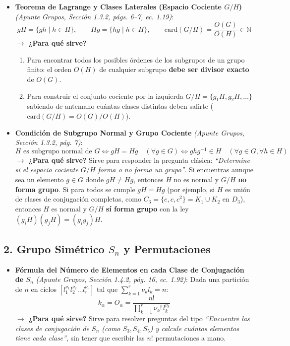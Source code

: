 \documentclass[11pt, a4paper]{article}
\begin{document}
\begin{itemize}
    \item \textbf{Teorema de Lagrange y Clases Laterales (Espacio Cociente $G/H$)} \textit{(Apunte Grupos, Sección 1.3.2, págs. 6--7, ec. 1.19)}:
    \[
    gH = \{gh \mid h \in H\}, \qquad Hg = \{hg \mid h \in H\}, \qquad \text{card}(G/H) = \frac{O(G)}{O(H)} \in \mathbb{N}
    \]
    \textbf{$\rightarrow$ ¿Para qué sirve?}
    \begin{enumerate}
        \item Para encontrar todos los posibles órdenes de los subgrupos de un grupo finito: el orden $O(H)$ de cualquier subgrupo \textbf{debe ser divisor exacto} de $O(G)$.
        \item Para construir el conjunto cociente por la izquierda $G/H = \{g_1 H, g_2 H, \dots\}$ sabiendo de antemano cuántas clases distintas deben salirte ($\text{card}(G/H) = O(G)/O(H)$).
    \end{enumerate}

    \item \textbf{Condición de Subgrupo Normal y Grupo Cociente} \textit{(Apunte Grupos, Sección 1.3.2, pág. 7)}:
    \[
    H \text{ es subgrupo normal de } G \iff gH = Hg \quad (\forall g \in G) \iff ghg^{-1} \in H \quad (\forall g \in G, \forall h \in H)
    \]
    \textbf{$\rightarrow$ ¿Para qué sirve?} Sirve para responder la pregunta clásica: \textit{``Determine si el espacio cociente $G/H$ forma o no forma un grupo''}. Si encuentras aunque sea un elemento $g \in G$ donde $gH \neq Hg$, entonces $H$ no es normal y $G/H$ \textbf{no forma grupo}. Si para todos se cumple $gH = Hg$ (por ejemplo, si $H$ es unión de clases de conjugación completas, como $C_3 = \{e, c, c^2\} = K_1 \cup K_2$ en $D_3$), entonces $H$ es normal y $G/H$ \textbf{sí forma grupo} con la ley $(g_i H)(g_j H) = (g_i g_j)H$.
\end{itemize}

\subsection*{2. Grupo Simétrico $S_n$ y Permutaciones}

\begin{itemize}
    \item \textbf{Fórmula del Número de Elementos en cada Clase de Conjugación de $S_n$} \textit{(Apunte Grupos, Sección 1.4.2, pág. 16, ec. 1.92)}:
    Dada una partición de $n$ en ciclos $[l_1^{\nu_1} l_2^{\nu_2} \dots l_r^{\nu_r}]$ tal que $\sum_{k=1}^r \nu_k l_k = n$:
    \[
    k_\alpha = O_\alpha = \frac{n!}{\prod_{k=1}^r \nu_k! \, l_k^{\nu_k}}
    \]
    \textbf{$\rightarrow$ ¿Para qué sirve?} Sirve para resolver preguntas del tipo \textit{``Encuentre las clases de conjugación de $S_n$ (como $S_3, S_4, S_5$) y calcule cuántos elementos tiene cada clase''}, sin tener que escribir las $n!$ permutaciones a mano.
\end{itemize}
\end{document}
